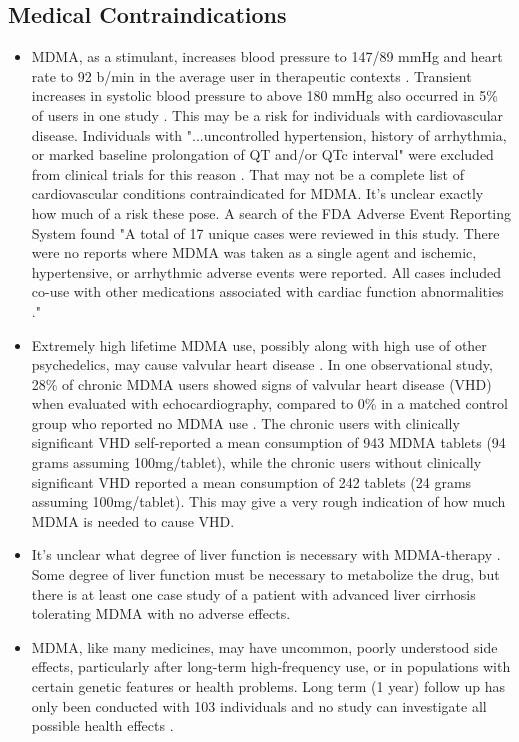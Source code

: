 \documentclass[12pt,letterpaper]{book}
\begin{document}
\subsection*{Medical Contraindications}
\begin{itemize}
    \item MDMA, as a stimulant, increases blood pressure to 147/89 mmHg and heart rate to 92 b/min in the average user in therapeutic contexts \cite{mitchellMDMAClinicalTrial}. Transient increases in systolic blood pressure to above 180 mmHg also occurred in 5\% of users in one study \cite{vizeliActuteEffects}. This may be a risk for individuals with cardiovascular disease. Individuals with "...uncontrolled hypertension, history of arrhythmia, or marked baseline prolongation of QT and/or QTc interval" were excluded from clinical trials for this reason \cite{mitchellMDMAClinicalTrial2}. That may not be a complete list of cardiovascular conditions contraindicated for MDMA. It's unclear exactly how much of a risk these pose. A search of the FDA Adverse Event Reporting System found "A total of 17 unique cases were reviewed in this study. There were no reports where MDMA was taken as a single agent and ischemic, hypertensive, or arrhythmic adverse events were reported. All cases included co-use with other medications associated with cardiac function abnormalities \cite{makunts2023concomitant}."
    \item Extremely high lifetime MDMA use, possibly along with high use of other psychedelics, may cause valvular heart disease \cite{droogmans2007valvular,tagen2023valvular}. In one observational study, 28\% of chronic MDMA users showed signs of valvular heart disease (VHD) when evaluated with echocardiography, compared to 0\% in a matched control group who reported no MDMA use \cite{droogmans2007valvular}. The chronic users with clinically significant VHD self-reported a mean consumption of 943 MDMA tablets (94 grams assuming 100mg/tablet), while the chronic users without clinically significant VHD reported a mean consumption of 242 tablets (24 grams assuming 100mg/tablet). This may give a very rough indication of how much MDMA is needed to cause VHD.
    \item It's unclear what degree of liver function is necessary with MDMA-therapy \cite{krausCirrhosis}. Some degree of liver function must be necessary to metabolize the drug, but there is at least one case study of a patient with advanced liver cirrhosis tolerating MDMA with no adverse effects.
    \item MDMA, like many medicines, may have uncommon, poorly understood side effects, particularly after long-term high-frequency use, or in populations with certain genetic features or health problems. Long term (1 year) follow up has only been conducted with 103 individuals and no study can investigate all possible health effects \cite{jeromeMDMALongTerm}.

\end{itemize}
\end{document}
